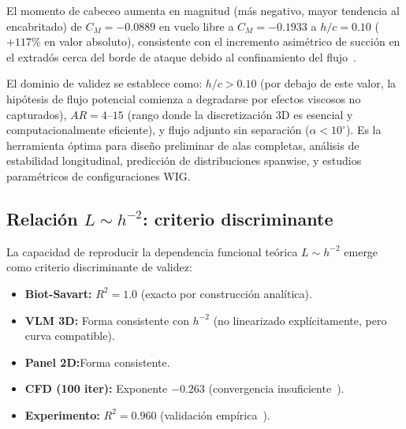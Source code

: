 \documentclass[twocolumn]{article}
\begin{document}
El momento de cabeceo aumenta en magnitud (más negativo, mayor tendencia al encabritado) de $C_M = -0.0889$ en vuelo libre a $C_M = -0.1933$ a $h/c = 0.10$ ($+117\%$ en valor absoluto), consistente con el incremento asimétrico de succión en el extradós cerca del borde de ataque debido al confinamiento del flujo~\cite{plotkin1988}.

El dominio de validez se establece como: $h/c > 0.10$ (por debajo de este valor, la hipótesis de flujo potencial comienza a degradarse por efectos viscosos no capturados), $\mathit{AR} = 4$--$15$ (rango donde la discretización 3D es esencial y computacionalmente eficiente), y flujo adjunto sin separación ($\alpha < 10^\circ$). Es la herramienta óptima para diseño preliminar de alas completas, análisis de estabilidad longitudinal, predicción de distribuciones spanwise, y estudios paramétricos de configuraciones WIG.


\subsection{Relación $L \sim h^{-2}$: criterio discriminante}

La capacidad de reproducir la dependencia funcional teórica $L \sim h^{-2}$ emerge como criterio discriminante de validez:

\begin{itemize}
    \item \textbf{Biot-Savart:} $R^2 = 1.0$ (exacto por construcción analítica).
    \item \textbf{VLM 3D:} Forma consistente con $h^{-2}$ (no linearizado explícitamente, pero curva compatible).
    \item \textbf{Panel 2D:}Forma consistente.
    \item \textbf{CFD (100 iter):} Exponente $-0.263$ (convergencia insuficiente~\cite{autodesk2024}).
    \item \textbf{Experimento:} $R^2 = 0.960$ (validación empírica~\cite{hernandez2012}).
\end{itemize}
\end{document}
